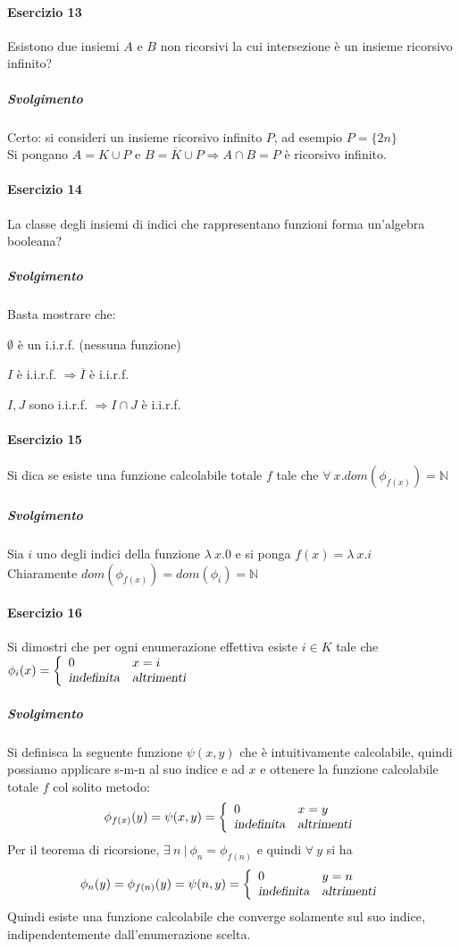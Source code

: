 \documentclass[10pt]{book}
\begin{document}
\paragraph{Esercizio 13} Esistono due insiemi $A$ e $B$ non ricorsivi la cui intersezione è un insieme ricorsivo infinito?
\subparagraph{Svolgimento} Certo: si consideri un insieme ricorsivo infinito $P$, ad esempio $P = \{2n\}$\\
Si pongano $A = K \cup P$ e $B = \overline{K} \cup P \Rightarrow A \cap B = P$ è ricorsivo infinito.
\paragraph{Esercizio 14} La classe degli insiemi di indici che rappresentano funzioni forma un'algebra booleana?
\subparagraph{Svolgimento} Basta mostrare che:
\begin{list}{}{}
	\item $\emptyset$ è un i.i.r.f. (nessuna funzione)
	\item $I$ è i.i.r.f. $\Rightarrow \overline{I}$ è i.i.r.f.
	\item $I,J$ sono i.i.r.f. $\Rightarrow I\cap J$ è i.i.r.f.
\end{list}
\paragraph{Esercizio 15} Si dica se esiste una funzione calcolabile totale $f$ tale che $\forall\:x.dom(\phi_{f(x)}) = \mathbb{N}$
\subparagraph{Svolgimento} Sia $i$ uno degli indici della funzione $\lambda\:x.0$ e si ponga $f(x) = \lambda\:x.i$\\
Chiaramente $dom(\phi_{f(x)}) = dom(\phi_i) = \mathbb{N}$
\paragraph{Esercizio 16} Si dimostri che per ogni enumerazione effettiva esiste $i\in K$ tale che $\phi_i(x) = \left\{\begin{array}{l l}
0&x = i\\
\textsl{indefinita}&\textsl{altrimenti}
\end{array}\right.$
\subparagraph{Svolgimento} Si definisca la seguente funzione $\psi(x,y)$ che è intuitivamente calcolabile, quindi possiamo applicare s-m-n al suo indice e ad $x$ e ottenere la funzione calcolabile totale $f$ col solito metodo:
$$\phi_{f(x)}(y) = \psi(x,y) = \left\{\begin{array}{l l}
0&x = y\\
\textsl{indefinita}&\textsl{altrimenti}
\end{array}\right.$$
Per il teorema di ricorsione, $\exists\:n\:|\:\phi_n = \phi_{f(n)}$ e quindi $\forall\:y$ si ha
$$\phi_n(y) = \phi_{f(n)}(y) = \psi(n,y) = \left\{\begin{array}{l l}
0&y = n\\
\textsl{indefinita}&\textsl{altrimenti}
\end{array}\right.$$
Quindi esiste una funzione calcolabile che converge solamente sul suo indice, indipendentemente dall'enumerazione scelta.
\pagebreak
\end{document}
